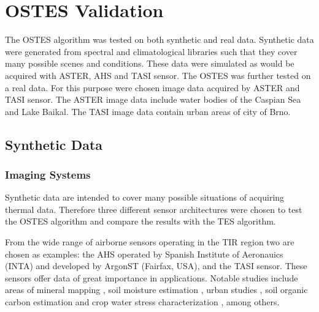 \chapter{OSTES Validation}
\label{chap:OSTESValid}

The OSTES algorithm was tested on both synthetic and real data. Synthetic data were generated from spectral and climatological  libraries such that they cover many possible scenes and conditions. These data were simulated as would be acquired with ASTER, AHS and TASI sensor. The OSTES was further tested on a real data. For this purpose were chosen image data acquired by ASTER and TASI sensor. The ASTER image data include water bodies of the Caspian Sea and Lake Baikal. The TASI image data contain urban areas of city of Brno. 

\section{Synthetic Data}

\subsection*{Imaging Systems}

Synthetic data are intended to cover many possible situations of acquiring thermal data. Therefore three different sensor architectures were chosen to test the OSTES algorithm and compare the results with the TES algorithm.

From the wide range of airborne sensors operating in the TIR region two are chosen as examples: the AHS operated by Spanish Institute of Aeronauics (INTA) and developed by ArgonST (Fairfax, USA), and the TASI sensor. These sensors offer data of great importance in applications. Notable studies include areas of
mineral mapping \cite{NK14}, 
soil moisture estimation \cite{SF12}, 
urban studies \cite{SO12},
soil organic carbon estimation \cite{PC14} and
crop water stress characterization \cite{PP12},
among others.

